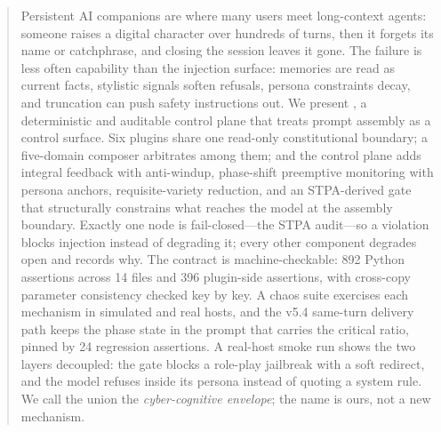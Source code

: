 \begin{abstract}
Persistent AI companions are where many users meet long-context agents: someone
raises a digital character over hundreds of turns, then it forgets its name or
catchphrase, and closing the session leaves it gone. The failure is less often
capability than the injection surface: memories are read as current facts,
stylistic signals soften refusals, persona constraints decay, and truncation can
push safety instructions out. We present \system{}, a deterministic and auditable
control plane that treats prompt assembly as a control surface. Six plugins share
one read-only constitutional boundary; a five-domain composer arbitrates among
them; and the control plane adds integral feedback with anti-windup, phase-shift
preemptive monitoring with persona anchors, requisite-variety reduction, and an
STPA-derived gate that structurally constrains what reaches the model at the
assembly boundary. Exactly one node is fail-closed---the STPA audit---so a
violation blocks injection instead of degrading it; every other component
degrades open and records why. The contract is machine-checkable: 892 Python
assertions across 14 files and 396 plugin-side assertions, with cross-copy
parameter consistency checked key by key. A chaos suite exercises each mechanism
in simulated and real hosts, and the v5.4 same-turn delivery path keeps the phase
state in the prompt that carries the critical ratio, pinned by 24 regression
assertions. A real-host smoke run shows the two layers decoupled: the gate blocks
a role-play jailbreak with a soft redirect, and the model refuses inside its
persona instead of quoting a system rule. We call the union the
\emph{cyber-cognitive envelope}; the name is ours, not a new mechanism.
\end{abstract}
